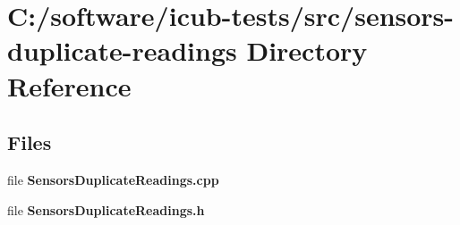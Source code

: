 \section{C\+:/software/icub-\/tests/src/sensors-\/duplicate-\/readings Directory Reference}
\label{dir_6fc1adc4fe0a69d5cc9f87dc6006118e}
\subsection*{Files}
\begin{DoxyCompactItemize}
\item 
file {\bfseries Sensors\+Duplicate\+Readings.\+cpp}
\item 
file {\bfseries Sensors\+Duplicate\+Readings.\+h}
\end{DoxyCompactItemize}
